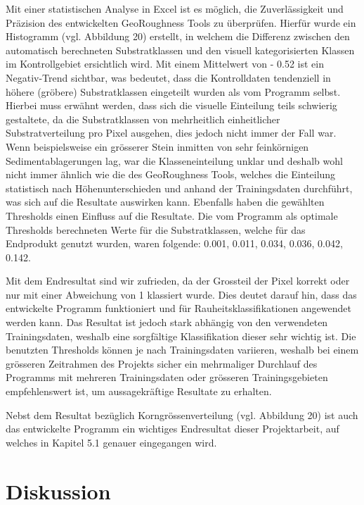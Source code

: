 \documentclass[12pt]{article}
\begin{document}
    Mit einer statistischen Analyse in Excel ist es möglich, die Zuverlässigkeit und Präzision des entwickelten GeoRoughness Tools zu überprüfen.
    Hierfür wurde ein Histogramm (vgl. Abbildung 20) erstellt, in welchem die Differenz zwischen den automatisch berechneten Substratklassen und den visuell kategorisierten Klassen im Kontrollgebiet ersichtlich wird. %
    Mit einem Mittelwert von - 0.52 ist ein Negativ-Trend sichtbar, was bedeutet, dass die Kontrolldaten tendenziell in höhere (gröbere) Substratklassen eingeteilt wurden als vom Programm selbst.
    Hierbei muss erwähnt werden, dass sich die visuelle Einteilung teils schwierig gestaltete, da die Substratklassen von mehrheitlich einheitlicher Substratverteilung pro Pixel ausgehen, dies jedoch nicht immer der Fall war.
    Wenn beispielsweise ein grösserer Stein inmitten von sehr feinkörnigen Sedimentablagerungen lag, war die Klasseneinteilung unklar und deshalb wohl nicht immer ähnlich wie die des GeoRoughness Tools, welches die Einteilung statistisch nach Höhenunterschieden und anhand der Trainingsdaten durchführt, was sich auf die Resultate auswirken kann.
    Ebenfalls haben die gewählten Thresholds einen Einfluss auf die Resultate.
    Die vom Programm als optimale Thresholds berechneten Werte für die Substratklassen, welche für das Endprodukt genutzt wurden, waren folgende: 0.001, 0.011, 0.034, 0.036, 0.042, 0.142.

    Mit dem Endresultat sind wir zufrieden, da der Grossteil der Pixel korrekt oder nur mit einer Abweichung von 1 klassiert wurde. 
    Dies deutet darauf hin, dass das entwickelte Programm funktioniert und für Rauheitsklassifikationen angewendet werden kann. 
    Das Resultat ist jedoch stark abhängig von den verwendeten Trainingsdaten, weshalb eine sorgfältige Klassifikation dieser sehr wichtig ist. 
    Die benutzten Thresholds können je nach Trainingsdaten variieren, weshalb bei einem grösseren Zeitrahmen des Projekts sicher ein mehrmaliger Durchlauf des Programms mit mehreren Trainingsdaten oder grösseren Trainingsgebieten empfehlenswert ist, um aussagekräftige Resultate zu erhalten.
    
    Nebst dem Resultat bezüglich Korngrössenverteilung (vgl. Abbildung 20) ist auch das entwickelte Programm ein wichtiges Endresultat dieser Projektarbeit, auf welches in Kapitel 5.1 genauer eingegangen wird. %

\section{Diskussion}\label{sec:diskussion}
\end{document}
